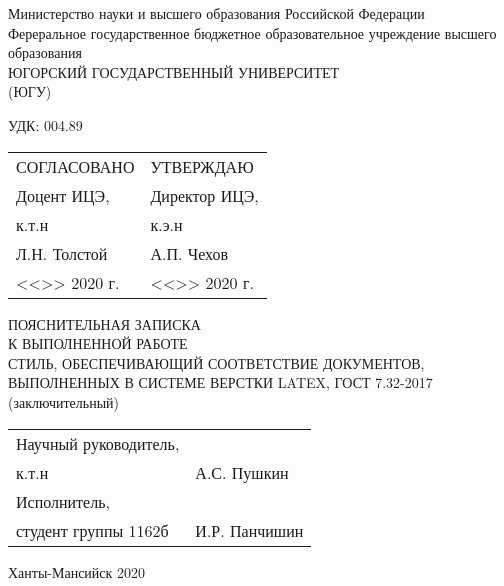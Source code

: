 \newcommand{\signplace}{\underline{\hspace{40mm}}}
\newcommand{\dateblank}{%
    <<\underline{\hspace{10mm}}>> \underline{\hspace{30mm}} 2020 г.%
}
\newlength{\twointerv}\setlength{\twointerv}{28.34pt}

\begin{titlepage}
    \singlespacing
    \setlength{\parindent}{0pt}
    \begin{center}
        Министерство науки и высшего образования Российской Федерации\\
        Фереральное государственное бюджетное образовательное учреждение
высшего образования\\
        ЮГОРСКИЙ ГОСУДАРСТВЕННЫЙ УНИВЕРСИТЕТ\\
        (ЮГУ)
    \end{center}

    \vspace{\twointerv}

    УДК: 004.89

    \vspace{\twointerv}

    \setlength{\tabcolsep}{0pt}
    \begin{tabular}{N{0.5\textwidth}N{80mm}}
        СОГЛАСОВАНО                 & УТВЕРЖДАЮ\\
        Доцент ИЦЭ,                 & Директор ИЦЭ,\\
        к.т.н                       & к.э.н\\
        \signplace{} Л.Н. Толстой   & \signplace{} А.П. Чехов\\
        \dateblank{}                & \dateblank{}
    \end{tabular}

    \vspace{\twointerv}

    \begin{center}
        ПОЯСНИТЕЛЬНАЯ ЗАПИСКА\\
        К ВЫПОЛНЕННОЙ РАБОТЕ\\
        \vspace{\twointerv}
        СТИЛЬ, ОБЕСПЕЧИВАЮЩИЙ СООТВЕТСТВИЕ ДОКУМЕНТОВ, ВЫПОЛНЕННЫХ В СИСТЕМЕ
ВЕРСТКИ LATEX, ГОСТ 7.32-2017\\
        (заключительный)
    \end{center}

    \vfill

    \begin{tabular}{N{70mm}N{80mm}}
        Научный руководитель,\\
        к.т.н & \signplace{} А.С. Пушкин\\
        \vspace{5mm}
        Исполнитель,\\
        студент группы 1162б & \signplace{} И.Р. Панчишин
    \end{tabular}

    \vfill

    \begin{center}
        Ханты-Мансийск 2020
    \end{center}
\end{titlepage}

\setcounter{page}{2}
